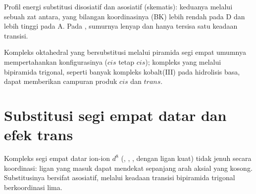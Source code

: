 \begin{omfigure}

{\small Profil energi substitusi disosiatif dan asosiatif
(skematis): keduanya melalui sebuah zat antara, yang bilangan koordinasinya
(BK) lebih rendah pada D dan lebih tinggi pada A. Pada ,
sumurnya lenyap dan hanya tersisa satu keadaan transisi.}
\end{omfigure}

Kompleks oktahedral yang bersubstitusi melalui piramida segi empat umumnya
mempertahankan konfigurasinya ($cis$ tetap $cis$); kompleks yang melalui
bipiramida trigonal, seperti banyak kompleks kobalt(III) pada hidrolisis basa, dapat memberikan
campuran produk $cis$ dan $trans$.

\section{Substitusi segi empat datar dan efek trans}

Kompleks segi empat datar ion-ion $d^8$ (, , ,  dengan ligan kuat)
tidak jenuh secara koordinasi: ligan yang masuk dapat mendekat sepanjang arah
aksial yang kosong. Substitusinya bersifat asosiatif, melalui keadaan transisi
bipiramida trigonal berkoordinasi lima.

